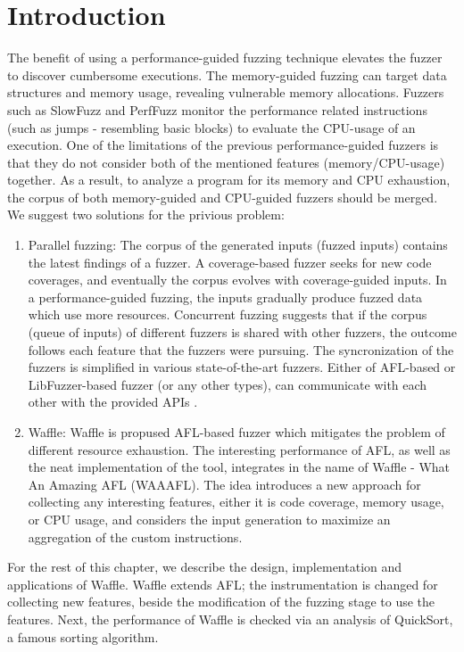 \section{Introduction}

The benefit of using a performance-guided fuzzing technique elevates the fuzzer to discover cumbersome executions. The memory-guided fuzzing can target data structures and memory usage, revealing vulnerable memory allocations. Fuzzers such as SlowFuzz and PerfFuzz monitor the performance related instructions (such as jumps - resembling basic blocks) to evaluate the CPU-usage of an execution. One of the limitations of the previous performance-guided fuzzers is that they do not consider both of the mentioned features (memory/CPU-usage) together. As a result, to analyze a program for its memory and CPU exhaustion, the corpus of both memory-guided and CPU-guided fuzzers should be merged. We suggest two solutions for the privious problem:

\begin{enumerate}
    \item Parallel fuzzing: The corpus of the generated inputs (fuzzed inputs) contains the latest findings of a fuzzer. A coverage-based fuzzer seeks for new code coverages, and eventually the corpus evolves with coverage-guided inputs. In a performance-guided fuzzing, the inputs gradually produce fuzzed data which use more resources. Concurrent fuzzing suggests that if the corpus (queue of inputs) of different fuzzers is shared with other fuzzers, the outcome follows each feature that the fuzzers were pursuing. The syncronization of the fuzzers is simplified in various state-of-the-art fuzzers. Either of AFL-based or LibFuzzer-based fuzzer (or any other types), can communicate with each other with the provided APIs \cite{afl_par}.
    
    \item Waffle: Waffle is propused AFL-based fuzzer which mitigates the problem of different resource exhaustion. The interesting performance of AFL, as well as the neat implementation of the tool, integrates in the name of Waffle - What An Amazing AFL (WAAAFL). The idea introduces a new approach for collecting any interesting features, either it is code coverage, memory usage, or CPU usage, and considers the input generation to maximize an aggregation of the custom instructions.
\end{enumerate}

For the rest of this chapter, we describe the design, implementation and applications of Waffle. Waffle extends AFL; the instrumentation is changed for collecting new features, beside the modification of the fuzzing stage to use the features. Next, the performance of Waffle is checked via an analysis of QuickSort, a famous sorting algorithm.

